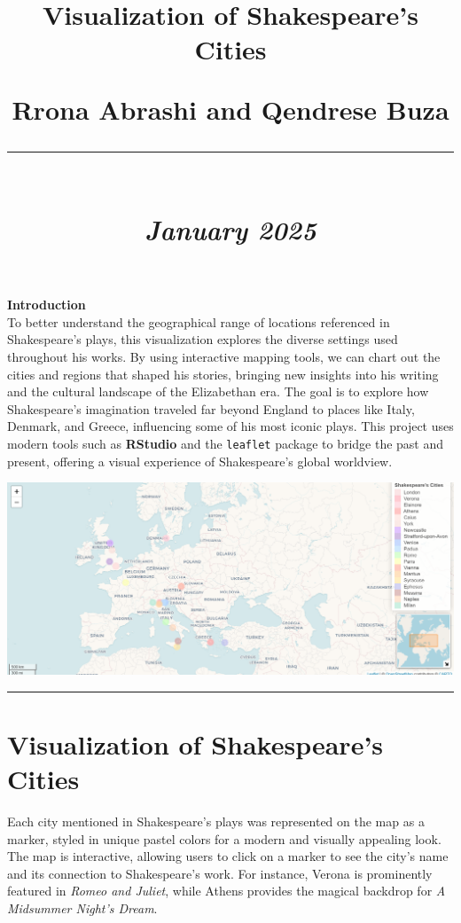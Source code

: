 \documentclass[a4paper,12pt]{article}
\title{
    \vspace{0cm} %
    \begin{flushleft} 
    \textbf{\huge \sffamily Visualization of Shakespeare's Cities} \\[0.5cm] %
    \end{flushleft}
    \LARGE \textbf{Rrona Abrashi and Qendrese Buza } \\[1cm]
    \textcolor{shakespeareyellow}{\rule{0.8\linewidth}{0.5mm}} \\[1cm]
    \large \textit{January 2025} 
    \vspace{1cm} %
}
\author{}
\date{}
\begin{document}
\maketitle

\noindent
\textbf{\huge \color{shakespeareblue} Introduction} \\[0.5cm]
To better understand the geographical range of locations referenced in Shakespeare’s plays, this visualization explores the diverse settings used throughout his works. By using interactive mapping tools, we can chart out the cities and regions that shaped his stories, bringing new insights into his writing and the cultural landscape of the Elizabethan era. The goal is to explore how Shakespeare’s imagination traveled far beyond England to places like Italy, Denmark, and Greece, influencing some of his most iconic plays. This project uses modern tools such as \textbf{RStudio} and the \texttt{leaflet} package to bridge the past and present, offering a visual experience of Shakespeare’s global worldview.

\vspace{1cm}

\begin{center}
    \includegraphics[width=0.8\linewidth]{RStudioMap.png} \\[0.5cm] %
    \textcolor{shakespeareyellow}{\rule{0.8\linewidth}{0.5mm}} %
\end{center}

\vspace{1cm}

\newpage

\section*{\color{shakespeareblue}Visualization of Shakespeare's Cities}
Each city mentioned in Shakespeare's plays was represented on the map as a marker, styled in unique pastel colors for a modern and visually appealing look. The map is interactive, allowing users to click on a marker to see the city's name and its connection to Shakespeare's work. For instance, Verona is prominently featured in \textit{Romeo and Juliet}, while Athens provides the magical backdrop for \textit{A Midsummer Night’s Dream}.
\end{document}
